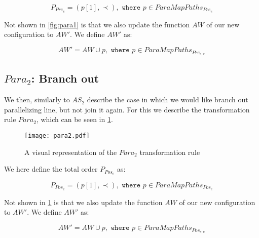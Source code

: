 \[P_{Pre_e} = (p[1], \prec), \texttt{ where } p \in ParaMapPaths_{Pre_e} \]

Not shown in \cref{fig:para1} is that we also update the function $AW$ of our new configuration to $AW'$. We define $AW'$ as:

\[AW' = AW \cup p, \texttt{ where } p \in ParaMapPaths_
{Pre_{s,e}}\]

\subsection{$Para_2$: Branch out}
We then, similarly to $AS_2$ describe the case in which we would like branch out parallelizing line, but not join it again. For this we describe the transformation rule $Para_2$, which can be seen in \cref{fig:para2}.

\begin{figure}[H]
	\centering
	\texttt{[image: para2.pdf]}
	\caption{A visual representation of the $Para_2$ transformation rule}
	\label{fig:para2}
\end{figure}

We here define the total order $P_{Pos_e}$ as:

\[P_{Pos_e} = (p[1], \prec), \texttt{ where } p \in ParaMapPaths_{Pos_e} \]

Not shown in \cref{fig:para2} is that we also update the function $AW$ of our new configuration to $AW'$. We define $AW'$ as:

\[AW' = AW \cup p, \texttt{ where } p \in ParaMapPaths_
{Pos_{s,e}}\]


